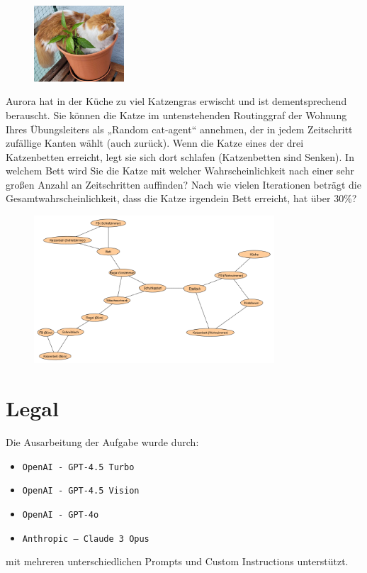 \documentclass[a4paper,11pt]{report}
\begin{document}
    \begin{figure}
        \centering
        \includegraphics[width=0.3\textwidth]{a07a_cat}
        \label{fig:a06_cat}
    \end{figure}

    Aurora hat in der Küche zu viel Katzengras erwischt und ist dementsprechend berauscht.
    Sie können die Katze im untenstehenden Routinggraf der Wohnung Ihres Übungsleiters als „Random cat-agent“ annehmen,
    der in jedem Zeitschritt zufällige Kanten wählt (auch zurück).
    Wenn die Katze eines der drei Katzenbetten erreicht, legt sie sich dort schlafen (Katzenbetten sind Senken).
    In welchem Bett wird Sie die Katze mit welcher Wahrscheinlichkeit nach einer sehr großen Anzahl an Zeitschritten auffinden?
    Nach wie vielen Iterationen beträgt die Gesamtwahrscheinlichkeit, dass die Katze irgendein Bett erreicht, hat über 30\%?

    \begin{figure}[h]
        \centering
        \includegraphics[width=0.8\textwidth]{a07a_graph}
        \label{fig:a07_graph}
    \end{figure}


    \newpage

    \chapter{Legal}
    \label{ch:legal}
    Die Ausarbeitung der Aufgabe wurde durch:

    \begin{itemize}
        \item \texttt{OpenAI - GPT-4.5 Turbo}
        \item \texttt{OpenAI - GPT-4.5 Vision}
        \item \texttt{OpenAI - GPT-4o}
        \item \texttt{Anthropic -- Claude 3 Opus}
    \end{itemize}

    mit mehreren unterschiedlichen Prompts und Custom Instructions unterstützt.
\end{document}
